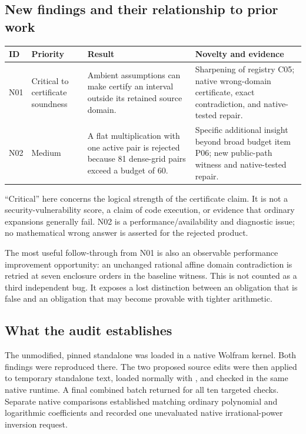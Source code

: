 \documentclass[11pt,a4paper]{article}
\newcommand{\code}[1]{\texttt{\detokenize{#1}}}
\begin{document}
\subsection{New findings and their relationship to prior work}
\begin{longtable}{@{}P{0.08\textwidth}P{0.14\textwidth}P{0.45\textwidth}P{0.25\textwidth}@{}}
\toprule ID & Priority & Result & Novelty and evidence\\\midrule\endhead
N01 & Critical to certificate soundness & Ambient assumptions can make \code{InverseCertificate} certify an interval outside its retained source domain. & Sharpening of registry C05; native wrong-domain certificate, exact contradiction, and native-tested repair.\\[4pt]
N02 & Medium & A flat multiplication with one active pair is rejected because 81 dense-grid pairs exceed a budget of 60. & Specific additional insight beyond broad budget item P06; new public-path witness and native-tested repair.\\
\bottomrule
\end{longtable}
``Critical'' here concerns the logical strength of the certificate claim. It is not a security-vulnerability score, a claim of code execution, or evidence that ordinary expansions generally fail. N02 is a performance/availability and diagnostic issue; no mathematical wrong answer is asserted for the rejected product.

The most useful follow-through from N01 is also an observable performance improvement opportunity: an unchanged rational affine domain contradiction is retried at seven enclosure orders in the baseline witness. This is not counted as a third independent bug. It exposes a lost distinction between an obligation that is false and an obligation that may become provable with tighter arithmetic.

\subsection{What the audit establishes}
The unmodified, pinned standalone was loaded in a native Wolfram kernel. Both findings were reproduced there. The two proposed source edits were then applied to temporary standalone text, loaded normally with \code{Get}, and checked in the same native runtime. A final combined batch returned \code{True} for all ten targeted checks. Separate native comparisons established matching ordinary polynomial and logarithmic coefficients and recorded one unevaluated native irrational-power inversion request.
\end{document}
